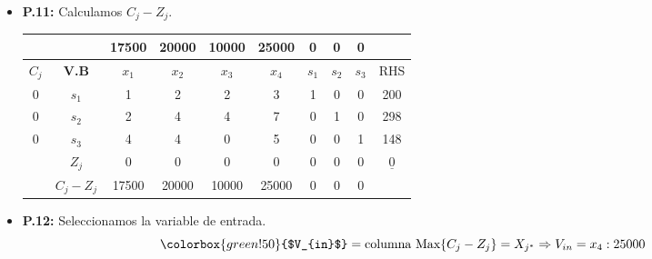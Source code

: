 \documentclass{templateNote}
\begin{document}
\begin{itemize}
    \newpage
    \item \textbf{P.11:} Calculamos $C_j - Z_j$.
    \begin{center}
        \begin{tabular}{|c|c|c|c|c|c|c|c|c|c|}
            \hline
            & & 17500 & 20000 & 10000 & 25000 & 0 & 0 & 0 & \\ \hline
            $C_j$ & \textbf{V.B} & $x_1$ & $x_2$ & $x_3$ & $x_4$ & $s_1$ & $s_2$ & $s_3$ & RHS \\ \hline
            0 & $s_1$ & 1 & 2 & 2 & 3 & 1 & 0 & 0 & 200 \\
            0 & $s_2$ & 2 & 4 & 4 & 7 & 0 & 1 & 0 & 298 \\
            0 & $s_3$ & 4 & 4 & 0 & 5 & 0 & 0 & 1 & 148 \\ \hline
            & $Z_j$ & 0 & 0 & 0 & 0 & 0 & 0 & 0 & $\underline{0}$ \\ \hline
            & $C_j - Z_j$ & 17500 & 20000 & 10000 & 25000 & 0 & 0 & 0 & \\ \hline
        \end{tabular}
    \end{center}

    \item \textbf{P.12:} Seleccionamos la variable de entrada.
    \begin{equation*}
        \colorbox{green!50}{$V_{in}$} = \text{columna Max} \{C_j-Z_j\} = X_{j^*} \Rightarrow V_{in} = x_4 : 25000
    \end{equation*}


\end{itemize}
\end{document}
